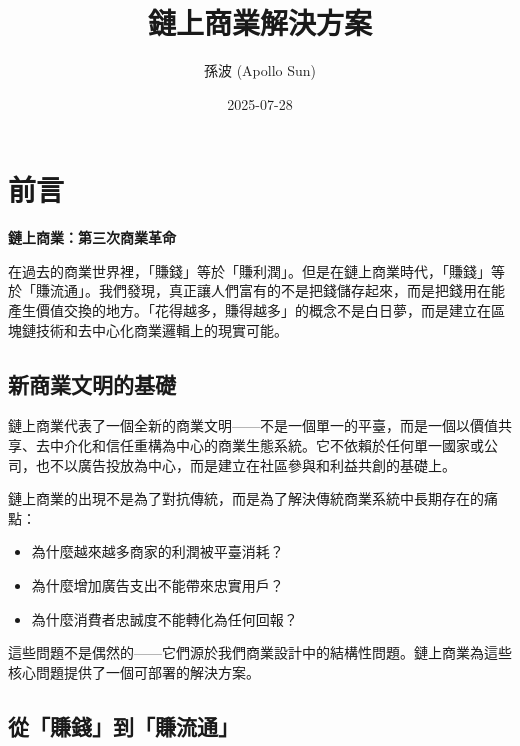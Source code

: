 \documentclass[
  Letterpaper,
]{scrbook}
\title{鏈上商業解決方案}
\author{孫波 (Apollo Sun)}
\date{2025-07-28}
\providecommand{\tightlist}{%
  \setlength{\itemsep}{0pt}\setlength{\parskip}{0pt}}
\renewcommand*\contentsname{Table of contents}
\newcommand\contentsname{Table of contents}
\begin{document}
\frontmatter
\maketitle

\renewcommand*\contentsname{Table of contents}
{
\setcounter{tocdepth}{1}
\tableofcontents
}

\mainmatter
{}

\chapter*{前言}\label{ux524dux8a00}


\textbf{鏈上商業：第三次商業革命}

在過去的商業世界裡，「賺錢」等於「賺利潤」。但是在鏈上商業時代，「賺錢」等於「賺流通」。我們發現，真正讓人們富有的不是把錢儲存起來，而是把錢用在能產生價值交換的地方。「花得越多，賺得越多」的概念不是白日夢，而是建立在區塊鏈技術和去中心化商業邏輯上的現實可能。

\section*{新商業文明的基礎}\label{ux65b0ux5546ux696dux6587ux660eux7684ux57faux790e}


鏈上商業代表了一個全新的商業文明------不是一個單一的平臺，而是一個以價值共享、去中介化和信任重構為中心的商業生態系統。它不依賴於任何單一國家或公司，也不以廣告投放為中心，而是建立在社區參與和利益共創的基礎上。

鏈上商業的出現不是為了對抗傳統，而是為了解決傳統商業系統中長期存在的痛點：

\begin{itemize}
\tightlist
\item
  為什麼越來越多商家的利潤被平臺消耗？
\item
  為什麼增加廣告支出不能帶來忠實用戶？
\item
  為什麼消費者忠誠度不能轉化為任何回報？
\end{itemize}

這些問題不是偶然的------它們源於我們商業設計中的結構性問題。鏈上商業為這些核心問題提供了一個可部署的解決方案。

\section*{從「賺錢」到「賺流通」}\label{ux5f9eux8cfaux9322ux5230ux8cfaux6d41ux901a}
\end{document}
